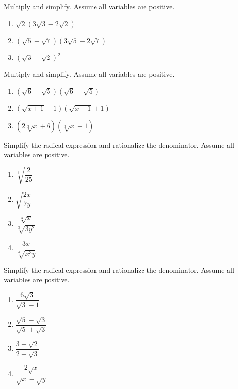 \documentclass[en,12pt]{elegantbook}
\providecommand{\tightlist}{%
  \setlength{\itemsep}{0pt}\setlength{\parskip}{0pt}}
\providecommand{\tightlist}{%
  \setlength{\itemsep}{0pt}\setlength{\parskip}{0pt}}
\let\BeginKnitrBlock\begin \let\EndKnitrBlock\end
\begin{document}
\BeginKnitrBlock{exercise}
\protect\hypertarget{exr:unnamed-chunk-100}{}{\label{exr:unnamed-chunk-100} }
Multiply and simplify. Assume all variables are positive.

\begin{enumerate}
\def\labelenumi{\arabic{enumi}.}
\tightlist
\item
  \(\sqrt2(3\sqrt3-2\sqrt2)\)
\item
  \((\sqrt5+\sqrt7)(3\sqrt5-2\sqrt7)\)
\item
  \((\sqrt3+\sqrt2)^2\)
\end{enumerate}
\EndKnitrBlock{exercise}

\BeginKnitrBlock{exercise}
\protect\hypertarget{exr:unnamed-chunk-101}{}{\label{exr:unnamed-chunk-101} }
Multiply and simplify. Assume all variables are positive.

\begin{enumerate}
\def\labelenumi{\arabic{enumi}.}
\tightlist
\item
  \((\sqrt6-\sqrt5)(\sqrt6+\sqrt5)\)
\item
  \((\sqrt{x+1}-1)(\sqrt{x+1}+1)\)
\item
  \((2\sqrt[3]x+6)(\sqrt[3]x+1)\)
\end{enumerate}
\EndKnitrBlock{exercise}

\BeginKnitrBlock{exercise}
\protect\hypertarget{exr:unnamed-chunk-102}{}{\label{exr:unnamed-chunk-102} }
Simplify the radical expression and rationalize the denominator. Assume all variables are positive.

\begin{enumerate}
\def\labelenumi{\arabic{enumi}.}
\tightlist
\item
  \(\sqrt[3]{\dfrac2{25}}\)
\item
  \(\sqrt{\dfrac{2x}{7y}}\)
\item
  \(\dfrac{\sqrt[3]{x}}{\sqrt[3]{3y^2}}\)
\item
  \(\dfrac{3x}{\sqrt[4]{x^3y}}\)
\end{enumerate}
\EndKnitrBlock{exercise}

\BeginKnitrBlock{exercise}
\protect\hypertarget{exr:unnamed-chunk-103}{}{\label{exr:unnamed-chunk-103} }
Simplify the radical expression and rationalize the denominator. Assume all variables are positive.

\begin{enumerate}
\def\labelenumi{\arabic{enumi}.}
\tightlist
\item
  \(\dfrac{6\sqrt3}{\sqrt3-1}\)
\item
  \(\dfrac{\sqrt5-\sqrt3}{\sqrt5+\sqrt3}\)
\item
  \(\dfrac{3+\sqrt2}{2+\sqrt3}\)
\item
  \(\dfrac{2\sqrt{x}}{\sqrt x- \sqrt y}\)
\end{enumerate}
\EndKnitrBlock{exercise}
\end{document}
